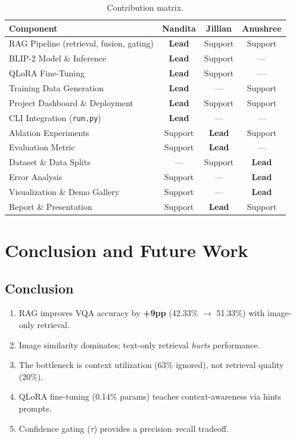 \documentclass[12pt, a4paper]{article}
\begin{document}
\begin{table}[H]
\centering
\caption{Contribution matrix.}
\renewcommand{\arraystretch}{1.3}
\begin{tabular}{@{} l c c c @{}}
\toprule
\textbf{Component} & \textbf{Nandita} & \textbf{Jillian} & \textbf{Anushree} \\
\midrule
RAG Pipeline (retrieval, fusion, gating) & \textbf{Lead} & Support & Support \\
BLIP-2 Model \& Inference & \textbf{Lead} & Support & --- \\
QLoRA Fine-Tuning & \textbf{Lead} & Support & --- \\
Training Data Generation & \textbf{Lead} & --- & Support \\
Project Dashboard \& Deployment & \textbf{Lead} & Support & Support \\
CLI Integration (\texttt{run.py}) & \textbf{Lead} & --- & --- \\
Ablation Experiments & Support & \textbf{Lead} & Support \\
Evaluation Metric & Support & \textbf{Lead} & --- \\
Dataset \& Data Splits & --- & Support & \textbf{Lead} \\
Error Analysis & Support & --- & \textbf{Lead} \\
Visualization \& Demo Gallery & Support & --- & \textbf{Lead} \\
Report \& Presentation & Support & \textbf{Lead} & Support \\
\bottomrule
\end{tabular}
\end{table}

\section{Conclusion and Future Work}

\subsection{Conclusion}

\begin{enumerate}[leftmargin=1.5cm]
    \item RAG improves VQA accuracy by \textbf{+9pp} (42.33\% $\rightarrow$ 51.33\%) with image-only retrieval.
    \item Image similarity dominates; text-only retrieval \emph{hurts} performance.
    \item The bottleneck is context utilization (63\% ignored), not retrieval quality (20\%).
    \item QLoRA fine-tuning (0.14\% params) teaches context-awareness via hints prompts.
    \item Confidence gating ($\tau$) provides a precision--recall tradeoff.
\end{enumerate}
\end{document}
